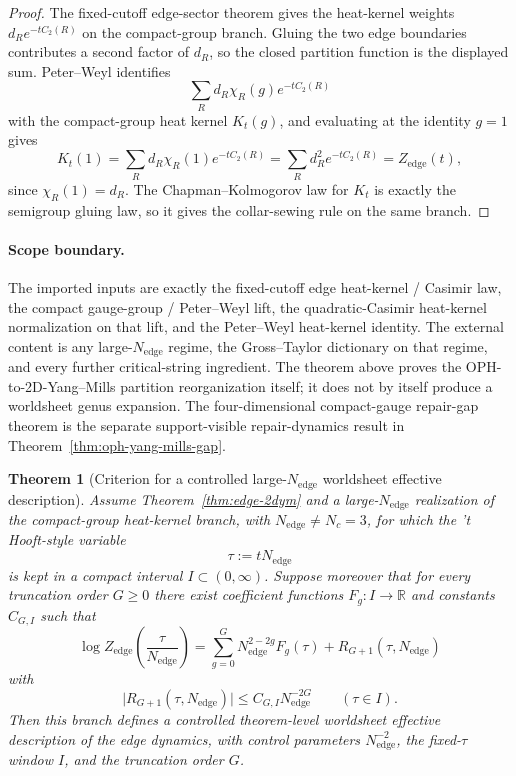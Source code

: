 \documentclass[11pt]{article}
\newtheorem{theorem}{Theorem}[section]
\begin{document}
\begin{proof}
The fixed-cutoff edge-sector theorem gives the heat-kernel weights \(d_R e^{-tC_2(R)}\) on the
compact-group branch. Gluing the two edge boundaries contributes a second factor of \(d_R\), so the
closed partition function is the displayed sum. Peter--Weyl identifies
\[
\sum_R d_R \chi_R(g)e^{-tC_2(R)}
\]
with the compact-group heat kernel \(K_t(g)\), and evaluating at the identity \(g=1\) gives
\[
K_t(1)=\sum_R d_R \chi_R(1)e^{-tC_2(R)}=\sum_R d_R^2 e^{-tC_2(R)}=Z_{\mathrm{edge}}(t),
\]
since \(\chi_R(1)=d_R\). The Chapman--Kolmogorov law for \(K_t\) is exactly the semigroup gluing
law, so it gives the collar-sewing rule on the same branch.
\end{proof}

\paragraph{Scope boundary.}
The imported inputs are exactly the fixed-cutoff edge heat-kernel / Casimir law, the compact
gauge-group / Peter--Weyl lift, the quadratic-Casimir heat-kernel normalization on that lift, and
the Peter--Weyl heat-kernel identity. The external content is any large-\(N_{\mathrm{edge}}\)
regime, the Gross--Taylor dictionary on that regime, and every further critical-string
ingredient. The theorem above proves the OPH-to-2D-Yang--Mills partition reorganization itself; it
does not by itself produce a worldsheet genus expansion. The four-dimensional compact-gauge
repair-gap theorem is the separate support-visible repair-dynamics result in
Theorem~\ref{thm:oph-yang-mills-gap}.

\begin{theorem}[Criterion for a controlled large-$N_{\mathrm{edge}}$ worldsheet effective description]\label{thm:worldsheet-largeN}
Assume Theorem~\ref{thm:edge-2dym} and a large-$N_{\mathrm{edge}}$
realization of the compact-group heat-kernel branch, with \(N_{\mathrm{edge}}\neq N_c=3\), for
which the 't Hooft-style variable
\[
\tau:=tN_{\mathrm{edge}}
\]
is kept in a compact interval \(I\subset (0,\infty)\). Suppose moreover that for every truncation
order \(G\ge 0\) there exist coefficient functions \(F_g:I\to\mathbb R\) and constants
\(C_{G,I}\) such that
\[
\log Z_{\mathrm{edge}}\!\left(\frac{\tau}{N_{\mathrm{edge}}}\right)
=
\sum_{g=0}^{G} N_{\mathrm{edge}}^{2-2g} F_g(\tau)
+
R_{G+1}(\tau,N_{\mathrm{edge}})
\]
with
\[
\bigl|R_{G+1}(\tau,N_{\mathrm{edge}})\bigr|
\le
C_{G,I}N_{\mathrm{edge}}^{-2G}
\qquad(\tau\in I).
\]
Then this branch defines a controlled theorem-level worldsheet effective description of the edge
dynamics, with control parameters \(N_{\mathrm{edge}}^{-2}\), the fixed-\(\tau\) window \(I\),
and the truncation order \(G\).
\end{theorem}
\end{document}
